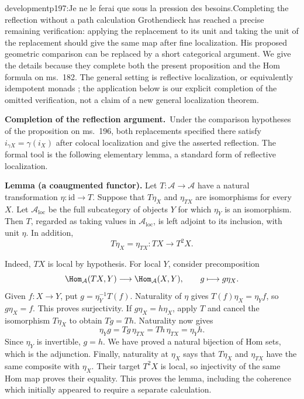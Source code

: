 \begin{dcomment}{development}{p197:Je ne le ferai que sous la pression des besoins.}{Completing the reflection without a path calculation}
Grothendieck has reached a precise remaining verification: applying the replacement to its unit and taking the unit of the replacement should give the same map after fine localization. His proposed geometric comparison can be replaced by a short categorical argument. We give the details because they complete both the present proposition and the Hom formula on ms.~182. The general setting is reflective localization, or equivalently idempotent monads \citep[Proposition~5.3.3]{Riehl2016}; the application below is our explicit completion of the omitted verification, not a claim of a new general localization theorem.

\textbf{Completion of the reflection argument.}\ours\
Under the comparison hypotheses of the proposition on ms.~196, both replacements specified there satisfy $i_{\gamma X}=\gamma(i_X)$ after colocal localization and give the asserted reflection. The formal tool is the following elementary lemma, a standard form of reflective localization.

\textbf{Lemma (a coaugmented functor).}
Let $T:\mathcal A\to\mathcal A$ have a natural transformation $\eta:\mathrm{id}\to T$. Suppose that $T\eta_X$ and $\eta_{TX}$ are isomorphisms for every $X$. Let $\mathcal A_{\mathrm{loc}}$ be the full subcategory of objects $Y$ for which $\eta_Y$ is an isomorphism. Then $T$, regarded as taking values in $\mathcal A_{\mathrm{loc}}$, is left adjoint to its inclusion, with unit $\eta$. In addition,
\[
T\eta_X=\eta_{TX}:TX\longrightarrow T^2X.
\]

Indeed, $TX$ is local by hypothesis. For local $Y$, consider precomposition
\[
\Hom_{\mathcal A}(TX,Y)\longrightarrow\Hom_{\mathcal A}(X,Y),
\qquad g\longmapsto g\eta_X.
\]
Given $f:X\to Y$, put $g=\eta_Y^{-1}T(f)$. Naturality of $\eta$ gives $T(f)\eta_X=\eta_Yf$, so $g\eta_X=f$. This proves surjectivity. If $g\eta_X=h\eta_X$, apply $T$ and cancel the isomorphism $T\eta_X$ to obtain $Tg=Th$. Naturality now gives
\[
\eta_Yg=Tg\,\eta_{TX}=Th\,\eta_{TX}=\eta_Yh.
\]
Since $\eta_Y$ is invertible, $g=h$. We have proved a natural bijection of Hom sets, which is the adjunction. Finally, naturality at $\eta_X$ says that $T\eta_X$ and $\eta_{TX}$ have the same composite with $\eta_X$. Their target $T^2X$ is local, so injectivity of the same Hom map proves their equality. This proves the lemma, including the coherence which initially appeared to require a separate calculation.


\end{dcomment}
